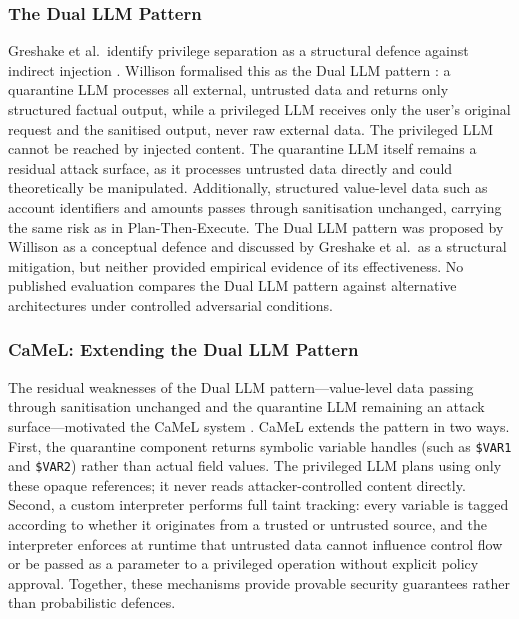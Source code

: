 \documentclass[conference]{IEEEtran}
\begin{document}

\subsubsection{The Dual LLM Pattern}

Greshake et al.\ identify privilege separation as a structural defence against indirect
injection \cite{greshake2023indirect}. Willison formalised this as the Dual LLM pattern
\cite{willison2023dual}: a quarantine LLM processes all external, untrusted data and
returns only structured factual output, while a privileged LLM receives only the
user's original request and the sanitised output, never raw external data. The privileged
LLM cannot be reached by injected content. The quarantine LLM itself
remains a residual attack surface, as it processes untrusted data directly and could
theoretically be manipulated. Additionally, structured value-level data such as account
identifiers and amounts passes through sanitisation unchanged, carrying the same risk as in
Plan-Then-Execute. The Dual LLM pattern was proposed by Willison as a conceptual defence
and discussed by Greshake et al.\ as a structural mitigation, but neither provided
empirical evidence of its effectiveness. No published evaluation compares the Dual LLM
pattern against alternative architectures under controlled adversarial conditions.


\subsubsection{CaMeL: Extending the Dual LLM Pattern}

The residual weaknesses of the Dual LLM pattern---value-level data passing through
sanitisation unchanged and the quarantine LLM remaining an attack surface---motivated
the CaMeL system \cite{camel2025}. CaMeL extends the pattern in two ways. First, the
quarantine component returns symbolic variable handles (such as \texttt{\$VAR1} and
\texttt{\$VAR2}) rather than actual field values. The privileged LLM plans using only
these opaque references; it never reads attacker-controlled content directly. Second, a
custom interpreter performs full taint tracking: every variable is tagged according to
whether it originates from a trusted or untrusted source, and the interpreter enforces
at runtime that untrusted data cannot influence control flow or be passed as a parameter
to a privileged operation without explicit policy approval. Together, these mechanisms
provide provable security guarantees rather than probabilistic defences.
\end{document}
